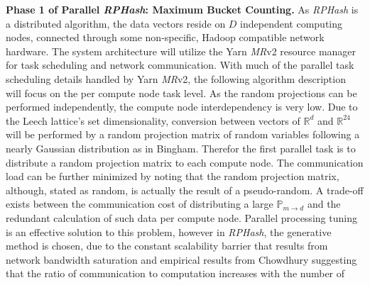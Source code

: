 \documentclass[a4paper,10pt]{article}
\begin{document}
\textbf{Phase 1 of Parallel \emph{RPHash}: Maximum Bucket Counting.}
As \emph{RPHash} is a distributed algorithm, the data vectors reside on
$D$ independent computing nodes, connected through some non-specific,
Hadoop\cite{hadoop} compatible network hardware.  The system architecture
will utilize the Yarn \emph{MR}v2 resource manager for task scheduling and
network communication.	With much of the parallel task scheduling details
handled by Yarn \emph{MR}v2, the following algorithm description will
focus on the per compute node task level.  As the random projections can
be performed independently, the compute node interdependency is very low.
Due to the Leech lattice's set dimensionality, conversion between vectors of
$\mathbb{R}^d$ and $\mathbb{R}^{24}$  will be performed by a random projection
matrix of random variables following a nearly Gaussian distribution as in
Bingham\cite{bingham}.	Therefor the first parallel task is to distribute
a random projection matrix to each compute node.  The communication load
can be further minimized by noting that the random projection matrix,
although, stated as random, is actually the result of a pseudo-random.
A trade-off exists between the communication cost of distributing a large
$\mathbb{P}_{m\rightarrow d}$ and the redundant calculation of such data
per compute node.  Parallel processing tuning is an effective solution to
this problem, however in \emph{RPHash}, the generative method is chosen,
due to the constant scalability barrier that results from network bandwidth
saturation and empirical results from Chowdhury\cite{chowdhury} suggesting
that the ratio of communication to computation increases with the number of
\end{document}

